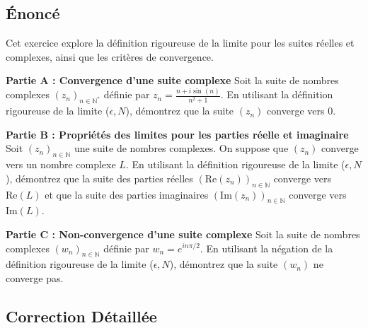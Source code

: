 \documentclass[a4paper,11pt]{report}
\begin{document}
\subsection*{Énoncé}

Cet exercice explore la définition rigoureuse de la limite pour les suites réelles et complexes, ainsi que les critères de convergence.

\textbf{Partie A : Convergence d'une suite complexe}
Soit la suite de nombres complexes $(z_n)_{n \in \mathbb{N}^*}$ définie par $z_n = \frac{n + i \sin(n)}{n^2+1}$.
En utilisant la définition rigoureuse de la limite ($\epsilon, N$), démontrez que la suite $(z_n)$ converge vers 0.

\textbf{Partie B : Propriétés des limites pour les parties réelle et imaginaire}
Soit $(z_n)_{n \in \mathbb{N}}$ une suite de nombres complexes. On suppose que $(z_n)$ converge vers un nombre complexe $L$.
En utilisant la définition rigoureuse de la limite ($\epsilon, N$), démontrez que la suite des parties réelles $(\text{Re}(z_n))_{n \in \mathbb{N}}$ converge vers $\text{Re}(L)$ et que la suite des parties imaginaires $(\text{Im}(z_n))_{n \in \mathbb{N}}$ converge vers $\text{Im}(L)$.

\textbf{Partie C : Non-convergence d'une suite complexe}
Soit la suite de nombres complexes $(w_n)_{n \in \mathbb{N}}$ définie par $w_n = e^{i n \pi / 2}$.
En utilisant la négation de la définition rigoureuse de la limite ($\epsilon, N$), démontrez que la suite $(w_n)$ ne converge pas.

\subsection*{Correction Détaillée}
\end{document}
